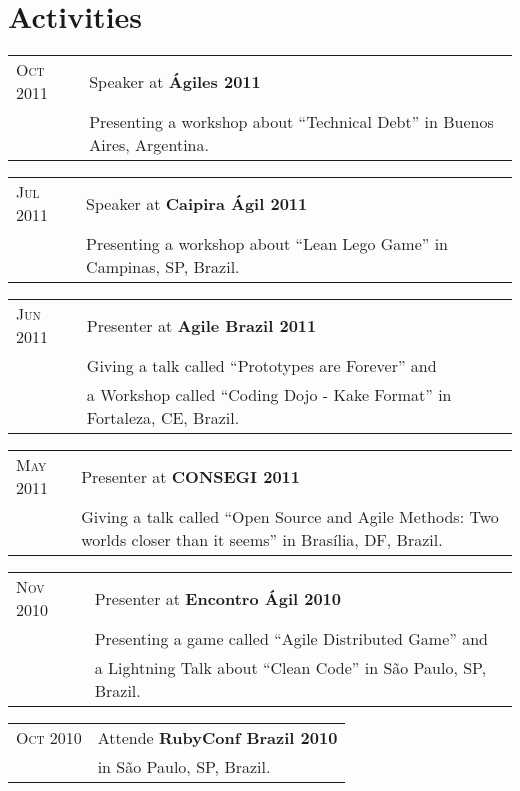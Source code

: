\documentclass[letter,10pt]{article}
\begin{document}
\section{Activities}

\begin{tabular}{p{2.5cm}l}
  \textsc{Oct 2011} & Speaker at \textbf{Ágiles 2011}\\
  &Presenting a workshop about ``Technical Debt'' in Buenos Aires, Argentina.\\
\end{tabular}

\begin{tabular}{p{2.5cm}l}
  \textsc{Jul 2011} & Speaker at \textbf{Caipira Ágil 2011}\\
  &Presenting a workshop about ``Lean Lego Game'' in Campinas, SP, Brazil.\\
\end{tabular}

\begin{tabular}{p{2.5cm}l}
  \textsc{Jun 2011} & Presenter at \textbf{Agile Brazil 2011}\\
  &Giving a talk called ``Prototypes are Forever'' and\\
  &a Workshop called ``Coding Dojo - Kake Format'' in Fortaleza, CE, Brazil.\\
\end{tabular}

\begin{tabular}{p{2.5cm}l}
  \textsc{May 2011} & Presenter at \textbf{CONSEGI 2011}\\
  &Giving a talk called ``Open Source and Agile Methods: Two worlds closer than it seems'' in Brasília, DF, Brazil.\\
\end{tabular}

\begin{tabular}{p{2.5cm}l}
  \textsc{Nov 2010} & Presenter at \textbf{Encontro Ágil 2010}\\
  &Presenting a game called ``Agile Distributed Game'' and\\
  & a Lightning Talk about ``Clean Code'' in São Paulo, SP, Brazil.\\
\end{tabular}

\begin{tabular}{p{2.5cm}l}
  \textsc{Oct 2010} & Attende \textbf{RubyConf Brazil 2010}\\
  & in São Paulo, SP, Brazil.\\
\end{tabular}
\end{document}
